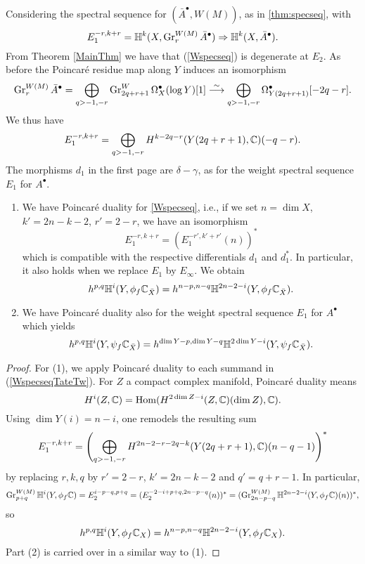 \documentclass[../main.tex]{subfiles}
\begin{document}
Considering the spectral sequence for $(\bar A^\bullet,W(M))$, as in \ref{thm:specseq}, with
\begin{equation}
\label{Wspecseq}
E^{-r,k+r}_1=\mathbb{H}^{k}(X,\operatorname{Gr}^{W(M)}_{r}\bar A^\bullet) \Rightarrow \mathbb{H}^{k}(X,\bar A^\bullet).
\end{equation}
From Theorem \ref{MainThm} we have that (\ref{Wspecseq}) is degenerate at $E_2$. As before the Poincar\'e residue map along $Y$ induces an isomorphism 
\[
\operatorname{Gr}^{W(M)}_{r} \bar A^\bullet 
= \bigoplus_{q>-1,-r}\operatorname{Gr}^{W}_{2q+r+1}\Omega^\bullet_X(\log Y)[1]
\stackrel{\sim}{\longrightarrow} \bigoplus_{q>-1,-r} \Omega^\bullet_{{Y}({2q+r+1})}[-2q-r].
\]
We thus have
\begin{align}
E^{-r,k+r}_1 =\bigoplus_{q>-1,-r} H^{k-2q-r}( Y({2q+r+1}),\mathbb{C})(-q-r).  \label{WspecseqTateTw}
\end{align}
The morphisms $d_1$ in the first page are $\delta-\gamma$, as for the weight spectral sequence $E_1$ for $A^\bullet$.

\begin{lemma} \textup{\cite[Lemma 4.7]{GKR17}} \label{lemWspecseq}
\begin{enumerate}
\item We have Poincar\'e duality for
\eqref{Wspecseq}, i.e., if we set $n=\dim X$, $k'=2n-k-2$, $r'=2-r$, we have an isomorphism
$$E_1^{-r,k+r}=(E_1^{-r',k'+r'}( n))^*$$
which is compatible with the respective differentials $d_1$ and $d_1^*$. 
In particular, it also holds when we replace $E_1$ by $E_\infty$. We obtain
$$h^{p,q}\mathbb{H}^i(Y,\phi_f\mathbb{C}_{\bar X}) = h^{n-p,n-q}\mathbb{H}^{2n-2-i}(Y,\phi_f\mathbb{C}_{\bar X}).$$
\item We have Poincar\'e duality also for the weight spectral sequence $E_1$ for $A^\bullet$ which yields
$$h^{p,q}\mathbb{H}^i(Y,\psi_f\mathbb{C}_{\bar X}) = h^{\dim Y-p,\dim Y-q}\mathbb{H}^{2\dim Y-i}(Y,\psi_f\mathbb{C}_{\bar X}).$$
\end{enumerate}
\end{lemma}

\begin{proof} 
For (1), we apply Poincar\'e duality to each summand in (\ref{WspecseqTateTw}). For $Z$ a compact complex manifold, Poincar\'e duality means 
\[
H^i(Z,\mathbb{C})=\operatorname{Hom}(H^{2\dim Z-i}(Z,\mathbb{C})( \dim Z),\mathbb{C}).
\] 
Using $\dim Y(i)=n-i$, one remodels the resulting sum 
$$E_1^{-r,k+r}=\left( \bigoplus_{q>-1,-r} 
H^{2n-2-r-2q-k}( Y({2q+r+1}),\mathbb{C})( n-q-1) \right) ^*$$
by replacing $r,k,q$ by $r'=2-r$, $k'=2n-k-2$ and $q'=q+r-1$. In particular,
\[
\operatorname{Gr}_{p+q}^{W(M)} \mathbb{H}^i(Y,\phi_f \mathbb{C})= E_2^{i-p-q,p+q}=  (E_2^{-2-i+p+q,2n-p-q}(n))^*= (\operatorname{Gr}_{2n-p-q}^{W(M)} \mathbb{H}^{2n-2-i}(Y,\phi_f \mathbb{C})(n))^* ,
\]
so
\[
h^{p,q}\mathbb{H}^i(Y,\phi_f\mathbb{C}_{ X}) = h^{n-p,n-q}\mathbb{H}^{2n-2-i}(Y,\phi_f\mathbb{C}_{ X}).
\]
Part (2) is carried over in a similar way to (1).
\end{proof}
\end{document}
